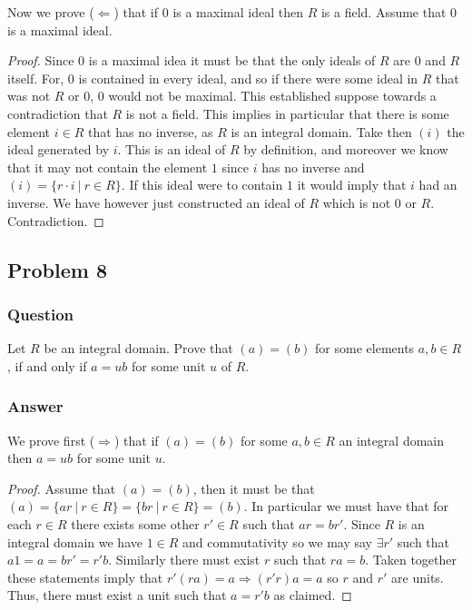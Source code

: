 \documentclass[12pt]{article}
\begin{document}
Now we prove ($\Leftarrow$) that if $0$ is a maximal ideal then $R$ is a field. Assume that $0$ is a maximal ideal.

\begin{proof} Since 0 is a maximal idea it must be that the only ideals of $R$ are $0$ and $R$ itself. For, 0 is contained in every ideal, and so if there were some ideal in $R$ that was not $R$ or 0, 0 would not be maximal. This established suppose towards a contradiction that $R$ is not a field. This implies in particular that there is some element $i \in R$ that has no inverse, as $R$ is an integral domain. Take then $(i)$ the ideal generated by $i$. This is an ideal of $R$ by definition, and moreover we know that it may not contain the element $1$ since $i$ has no inverse and $(i)= \{ r\cdot i\ |\ r \in R \}$. If this ideal were to contain $1$ it would imply that $i$ had an inverse. We have however just constructed an ideal of $R$ which is not 0 or $R$. Contradiction.
\end{proof}

\subsection{Problem 8}

\subsubsection{Question}
Let $R$ be an integral domain. Prove that $(a) = (b)$ for some elements $a, b \in R$, if and only if $a = u b $ for some unit $u$ of $R$.
\subsubsection{Answer}
We prove first ($\Rightarrow$) that if $(a) = (b)$ for some $a,b \in R $ an integral domain then $a=u b $ for some unit $u$. 

\begin{proof} Assume that $(a)=(b)$, then it must be that $(a) = \{ a r \ |\ r\in R\} = \{ b r \ |\ r\in R\} = (b)$. In particular we must have that for each $r \in R $ there exists some other $r' \in R$ such that $a r = b r'$. Since $R$ is an integral domain we have $1 \in R$ and commutativity so we may say $ \exists r' $ such that $a 1 = a = b r' = r' b$. Similarly there must exist $r$ such that $ra = b$. Taken together these statements imply that $r'(ra)=a \Rightarrow (r' r)a=a$ so $r$ and $r'$ are units. Thus, there must exist  a unit such that $a=r' b $ as claimed.
\end{proof}
\end{document}
